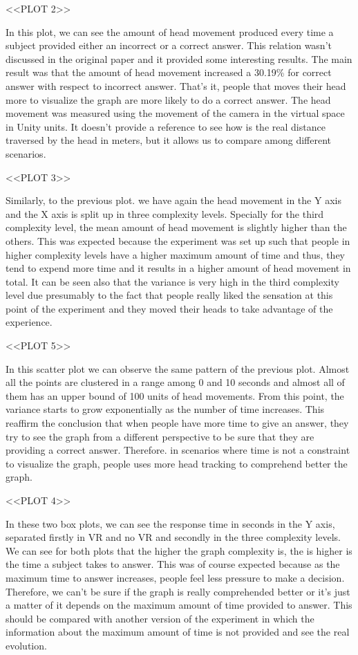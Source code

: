 \textless{}\textless{}PLOT 2\textgreater{}\textgreater{}

In this plot, we can see the amount of head movement produced every time
a subject provided either an incorrect or a correct answer. This
relation wasn't discussed in the original paper and it provided some
interesting results. The main result was that the amount of head
movement increased a 30.19\% for correct answer with respect to
incorrect answer. That's it, people that moves their head more to
visualize the graph are more likely to do a correct answer. The head
movement was measured using the movement of the camera in the virtual
space in Unity units. It doesn't provide a reference to see how is the
real distance traversed by the head in meters, but it allows us to
compare among different scenarios.

\textless{}\textless{}PLOT 3\textgreater{}\textgreater{}

Similarly, to the previous plot. we have again the head movement in the
Y axis and the X axis is split up in three complexity levels. Specially
for the third complexity level, the mean amount of head movement is
slightly higher than the others. This was expected because the
experiment was set up such that people in higher complexity levels have
a higher maximum amount of time and thus, they tend to expend more time
and it results in a higher amount of head movement in total. It can be
seen also that the variance is very high in the third complexity level
due presumably to the fact that people really liked the sensation at
this point of the experiment and they moved their heads to take
advantage of the experience.

\textless{}\textless{}PLOT 5\textgreater{}\textgreater{}

In this scatter plot we can observe the same pattern of the previous
plot. Almost all the points are clustered in a range among 0 and 10
seconds and almost all of them has an upper bound of 100 units of head
movements. From this point, the variance starts to grow exponentially as
the number of time increases. This reaffirm the conclusion that when
people have more time to give an answer, they try to see the graph from
a different perspective to be sure that they are providing a correct
answer. Therefore. in scenarios where time is not a constraint to
visualize the graph, people uses more head tracking to comprehend better
the graph.

\textless{}\textless{}PLOT 4\textgreater{}\textgreater{}

In these two box plots, we can see the response time in seconds in the Y
axis, separated firstly in VR and no VR and secondly in the three
complexity levels. We can see for both plots that the higher the graph
complexity is, the is higher is the time a subject takes to answer. This
was of course expected because as the maximum time to answer increases,
people feel less pressure to make a decision. Therefore, we can't be
sure if the graph is really comprehended better or it's just a matter of
it depends on the maximum amount of time provided to answer. This should
be compared with another version of the experiment in which the
information about the maximum amount of time is not provided and see the
real evolution.

